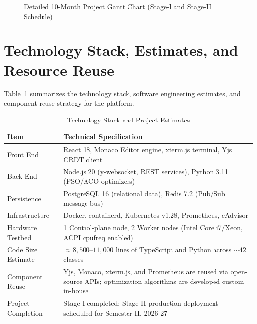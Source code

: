 \documentclass[12pt,a4paper]{report}
\begin{document}
\begin{figure}[H]
{}
		\caption{Detailed 10-Month Project Gantt Chart (Stage-I and Stage-II Schedule)}
		\label{fig:gantt_chart}
	\end{figure}
	
	\section{Technology Stack, Estimates, and Resource Reuse}
	Table~\ref{tab:stack} summarizes the technology stack, software engineering estimates, and component reuse strategy for the platform.
	
	\begin{table}[H]
		\centering
		\caption{Technology Stack and Project Estimates}
		\label{tab:stack}
		\begin{tabularx}{\linewidth}{@{}p{3.5cm}X@{}}
			\toprule
			\textbf{Item} & \textbf{Technical Specification} \\ \midrule
			Front End & React 18, Monaco Editor engine, xterm.js terminal, Yjs CRDT client \\
			Back End & Node.js 20 (y-websocket, REST services), Python 3.11 (PSO/ACO optimizers) \\
			Persistence & PostgreSQL 16 (relational data), Redis 7.2 (Pub/Sub message bus) \\
			Infrastructure & Docker, containerd, Kubernetes v1.28, Prometheus, cAdvisor \\
			Hardware Testbed & 1 Control-plane node, 2 Worker nodes (Intel Core i7/Xeon, ACPI cpufreq enabled) \\
			Code Size Estimate & $\approx 8,500$--$11,000$ lines of TypeScript and Python across $\sim 42$ classes \\
			Component Reuse & Yjs, Monaco, xterm.js, and Prometheus are reused via open-source APIs; optimization algorithms are developed custom in-house \\
			Project Completion & Stage-I completed; Stage-II production deployment scheduled for Semester II, 2026-27 \\ \bottomrule
		\end{tabularx}
	\end{table}
	
\end{document}
